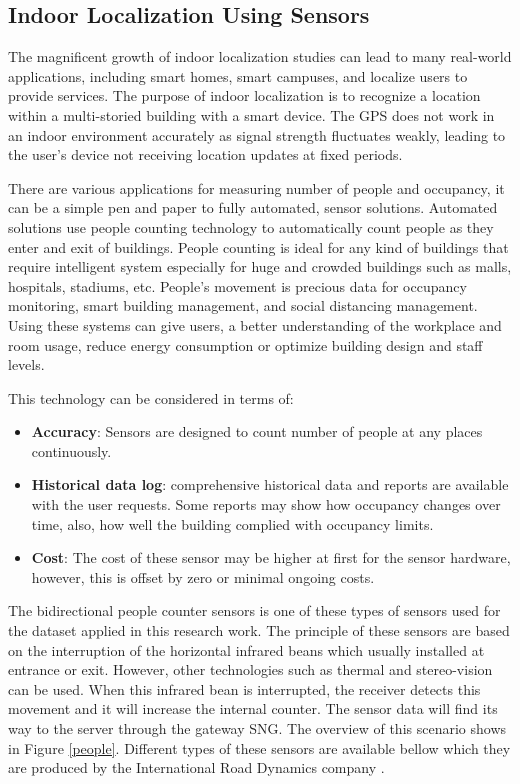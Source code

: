 \documentclass[../UNBThesis2.tex]{subfiles}
\begin{document}
\subsection{Indoor Localization Using Sensors}
The magnificent growth of indoor localization studies can lead to many real-world applications, including smart homes, smart campuses, and localize users to provide services. The purpose of indoor localization is to recognize a location within a multi-storied building with a smart device.  The GPS does not work in an indoor environment accurately as signal strength fluctuates weakly, leading to the user’s device not receiving location updates at fixed periods. 

There are various applications for measuring number of people and occupancy, it can be a simple pen and paper to fully automated, sensor solutions.
Automated solutions use people counting technology to automatically count people as they enter and exit of buildings. People counting is ideal for any kind of buildings that require intelligent system especially for huge and crowded buildings such as malls, hospitals, stadiums, etc. People's movement is precious data for occupancy monitoring, smart building management, and social distancing management.  Using these systems can give users, a better understanding of the workplace and room usage, reduce energy consumption or optimize building design and staff levels.

This technology can be considered in terms of:
\begin{itemize}
    \item\textbf{Accuracy}: Sensors are designed to count number of people at any places continuously.
    \item\textbf{Historical data log}: comprehensive historical data and reports are available with the user requests. Some reports may show how occupancy changes over time, also, how well the building complied with occupancy limits.
    \item\textbf{Cost}: The cost of these sensor may be higher at first for the sensor hardware, however, this is offset by zero or minimal ongoing costs.
\end{itemize}

The bidirectional people counter sensors is one of these types of sensors used for the dataset applied in this research work. The principle of these sensors are based on the interruption of the horizontal infrared beans which usually installed at entrance or exit. However, other technologies such as thermal and stereo-vision can be used. When this infrared bean is interrupted, the receiver detects this movement and it will increase the internal counter. The sensor data will find its way to the server through the gateway SNG. The overview of this scenario shows in Figure \ref{people}. Different types of these sensors are available bellow which they are produced by the International Road Dynamics company  .
\end{document}
